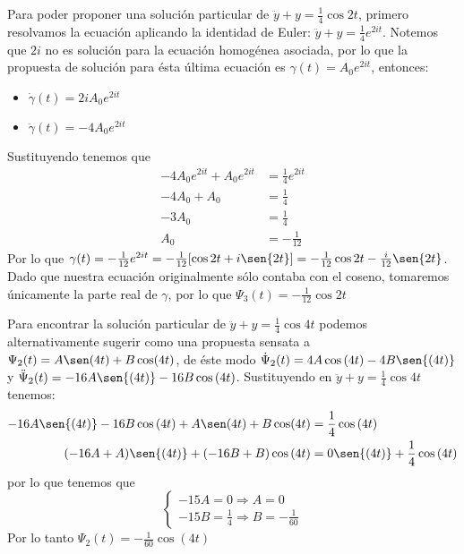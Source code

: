 \documentclass{article}
\begin{document}
\begin{enumerate}
{            Para poder proponer una solución particular de $\ddot y+y=\frac{1}{4}\cos{2t}$, primero
            resolvamos la ecuación aplicando la identidad de Euler: $\ddot y+y=\frac{1}{4}e^{2it}$.
            Notemos que $2i$ no es solución para la ecuación homogénea asociada, por lo que la
            propuesta de solución para ésta última ecuación es $\gamma(t)=A_0e^{2it}$, entonces:
            \begin{itemize}
                \item $\dot\gamma(t)=2iA_0e^{2it}$
                \item $\ddot\gamma(t)=-4A_0e^{2it}$
            \end{itemize}
            Sustituyendo tenemos que
            \begin{align*}
                -4A_0e^{2it}+A_0e^{2it} &= \frac{1}{4}e^{2it} \\[0.2cm]
                -4A_0+A_0 &= \frac{1}{4} \\[0.2cm]
                -3A_0 &= \frac{1}{4} \\[0.2cm]
                A_0 &= -\frac{1}{12}
            \end{align*}
            Por lo que $\gamma(t)=-\frac{1}{12}e^{2it}=-\frac{1}{12}[\cos{2t}+i\sen{2t}]
            =-\frac{1}{12}\cos{2t}-\frac{i}{12}\sen{2t}$. Dado que nuestra ecuación originalmente
            sólo contaba con el coseno, tomaremos únicamente la parte real de $\gamma$, por lo que
            $\Psi_3(t)=-\frac{1}{12}\cos{2t}$

            Para encontrar la solución particular de $\ddot y+y=\frac{1}{4}\cos{4t}$ podemos
            alternativamente sugerir como una propuesta sensata a $\Psi_2(t)=A\sen(4t)+B\cos(4t)$,
            de éste modo $\dot\Psi_2(t)=4A\cos{(4t)}-4B\sen{(4t)}$ y $\ddot\Psi_2(t)=-16A\sen{(4t)}
            -16B\cos{(4t)}$. Sustituyendo en $\ddot y+y=\frac{1}{4}\cos{4t}$ tenemos:
            \begin{align*}
                -16A\sen{(4t)}-16B\cos{(4t)}+A\sen(4t)+B\cos(4t) &= \frac{1}{4}\cos{(4t)} \\
                (-16A+A)\sen{(4t)}+(-16B+B)\cos{(4t)} &= 0\sen{(4t)}+\frac{1}{4}\cos{(4t)} 
            \end{align*}
            por lo que tenemos que
            \begin{equation*}
                \begin{cases}
                    -15A=0 \Rightarrow A=0 \\
                    -15B=\frac{1}{4} \Rightarrow B=-\frac{1}{60}
                \end{cases}
            \end{equation*}
            Por lo tanto $\Psi_2(t)=-\frac{1}{60}\cos{(4t)}$

}
\end{enumerate}
\end{document}

